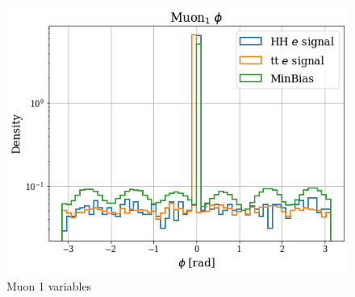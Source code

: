 \documentclass[../main.tex]{subfiles}
\begin{document}
\begin{figure}[!ht]
\begin{minipage}[b]{0.33\linewidth}
    \centering
    \includegraphics[width=1\linewidth]{Chapters/Plots/Hist_1ele_muon1_Phi.png}
  \end{minipage}
  \caption{Muon 1 variables}
\end{figure}
\end{document}
